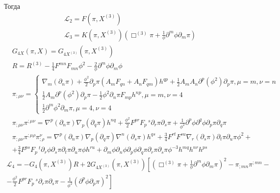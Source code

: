 \documentclass[12pt,a4paper,svgnames]{extarticle}
\begin{document}
Тогда 
\begin{align}
	& \mathcal{L}_{2} = F\left(\pi, X^{(3)}\right)\\
	& \mathcal{L}_{3} = K\left(\pi, X^{(3)}\right) \left(\Box^{(3)}\pi+ \frac{1}{\phi}\partial^{m}{\phi} \partial_{m}{\pi}\right)
\end{align}
\begin{align}
	& G_{4X}\left(\pi,X\right) = G_{4X^{(3)}}\left(\pi,X^{(3)}\right)\\
	&R = R^{(3)}-\frac{1}{4}F^{mn}F_{mn}{\phi}^{2}-\frac{2}{\phi}\partial^{m}{\phi}\partial_{m}{\phi} \\
	& \pi_{;\mu\nu} = \begin{cases}
		\nabla_{m}(\partial_{n}\pi)+\frac{{\phi}^{2}}{2}\partial_{p}{\pi}\left(A_{m} F_{q n}+A_{n} F_{q m}\right)h^{q p} + \frac{1}{2}A_{m} A_{n} \partial^{p}{(\phi^2)} \partial_{p}{\pi} , \mu=m, \nu=n\\
		 \frac{1}{2}A_{m} \partial^{p}{(\phi^2)} \partial_{p}{\pi} - \frac{1}{2} {\phi}^{2}\partial_{n}{\pi} F_{m p} h^{n p}, \mu=m, \nu=4\\
		 \frac{1}{2}\partial^{m}{{\phi}^{2}} \partial_{m}{\pi}, \mu=4,\nu=4
	\end{cases}\\
	&\pi_{;\mu\nu}\pi^{;\mu\nu} = \nabla^{p}({\partial_{n}{\pi}}) \nabla_{p}({\partial_{q}{\pi}}) h^{n q}+\frac{{\phi}^{2}}{2}F^{p r} F_{p}\,^{s} \partial_{r}{\pi} \partial_{s}{\pi} +\frac{1}{\phi^2}\partial^{p}{\phi} \partial^{q}{\phi} \partial_{p}{\pi} \partial_{q}{\pi}\\
	&\pi_{;\mu\nu}\pi^{;\mu\rho}\pi^{\nu}_{;\rho} = \nabla^{p}({\partial_{n}{\pi}}) \nabla_{p}({\partial_{q}{\pi}}) \nabla^{n}({\partial_{s}{\pi}}) h^{q s}+\frac{3}{4}F^{r t} F^{s u} \nabla_{r}({\partial_{s}{\pi}}) \partial_{t}{\pi} \partial_{u}{\pi} {\phi}^{2}+\nonumber\\
	&+\frac{3}{4}F^{p s} F_{p}\,^{t} \partial_{r}{\phi} \partial_{s}{\pi} \partial_{t}{\pi} \partial_{u}{\pi} \phi h^{r u}+\partial_{m}{\phi} \partial_{n}{\phi} \partial_{p}{\phi} \partial_{q}{\pi} \partial_{r}{\pi} \partial_{s}{\pi} {\phi}^{-3} h^{m q} h^{n r} h^{p s}
\end{align}
\begin{align}
	\mathcal{L}_{4} = -G_4(\pi,X^{(3)})R + 2G_{4X^{(3)}}(\pi,X^{(3)})\left[\left(\Box^{(3)}\pi+ \frac{1}{\phi}\partial^{m}{\phi} \partial_{m}{\pi}\right)^2 - \pi_{;mn}\pi^{;mn} -\right. \nonumber\\
	\left.- \frac{{\phi}^{2}}{2}F^{p r} F_{p}\,^{s} \partial_{r}{\pi} \partial_{s}{\pi} -\frac{1}{\phi^2}\left(\partial^{p}{\phi} \partial_{p}{\pi}\right)^2 \right]
\end{align}
\end{document}
